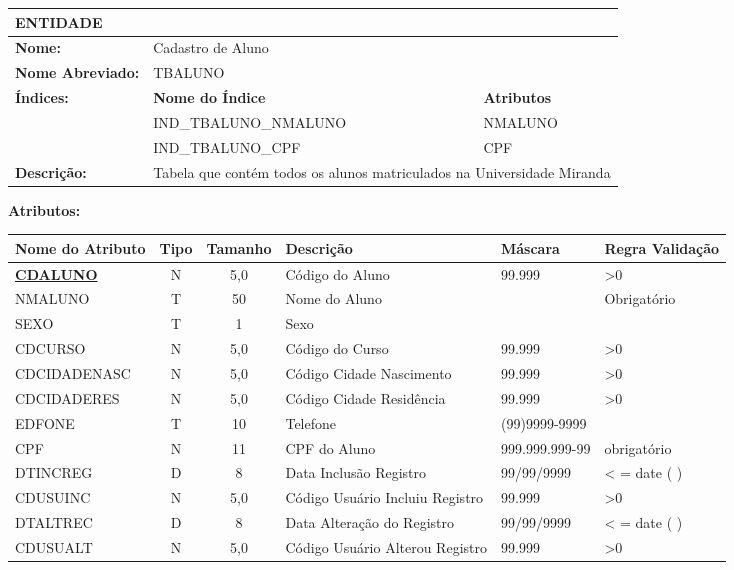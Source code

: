 \begin{landscape}
\noindent
\begin{tabular}{|p{4.0cm}|p{12.0cm}|p{5.0cm}|}
\hline
\textbf{ENTIDADE} & & \\
\hline
\textbf{Nome:} & \multicolumn{2}{p{17.4cm}|}{Cadastro de Aluno} \\
\hline
\textbf{Nome Abreviado:} & \multicolumn{2}{p{17.4cm}|}{TBALUNO} \\
\hline
\textbf{Índices:} & \textbf{Nome do Índice} & \textbf{Atributos} \\
\hline
 & IND\_TBALUNO\_NMALUNO & NMALUNO \\
\hline
 & IND\_TBALUNO\_CPF & CPF \\
\hline
\textbf{Descrição:} & \multicolumn{2}{p{17.4cm}|}{Tabela que contém todos os alunos
matriculados na Universidade Miranda} \\
\hline
\end{tabular}

\vspace{0.4cm}

\noindent\textbf{Atributos:}

\noindent
\begin{tabular}{|p{3.6cm}|c|c|p{7.0cm}|p{2.8cm}|p{3.0cm}|}
\hline
\textbf{Nome do Atributo} & \textbf{Tipo} & \textbf{Tamanho} & \textbf{Descrição} &
\textbf{Máscara} & \textbf{Regra Validação} \\
\hline
\textbf{\underline{CDALUNO}} & N & 5,0 & Código do Aluno & 99.999 & >0 \\
\hline
NMALUNO & T & 50 & Nome do Aluno & & Obrigatório \\
\hline
SEXO & T & 1 & Sexo & & \\
\hline
CDCURSO & N & 5,0 & Código do Curso & 99.999 & >0 \\
\hline
CDCIDADENASC & N & 5,0 & Código Cidade Nascimento & 99.999 & >0 \\
\hline
CDCIDADERES & N & 5,0 & Código Cidade Residência & 99.999 & >0 \\
\hline
EDFONE & T & 10 & Telefone & (99)9999-9999 & \\
\hline
CPF & N & 11 & CPF do Aluno & 999.999.999-99 & obrigatório \\
\hline
DTINCREG & D & 8 & Data Inclusão Registro & 99/99/9999 & < = date ( ) \\
\hline
CDUSUINC & N & 5,0 & Código Usuário Incluiu Registro & 99.999 & >0 \\
\hline
DTALTREC & D & 8 & Data Alteração do Registro & 99/99/9999 & < = date ( ) \\
\hline
CDUSUALT & N & 5,0 & Código Usuário Alterou Registro & 99.999 & >0 \\
\hline
\end{tabular}

\normalsize
\end{landscape}
